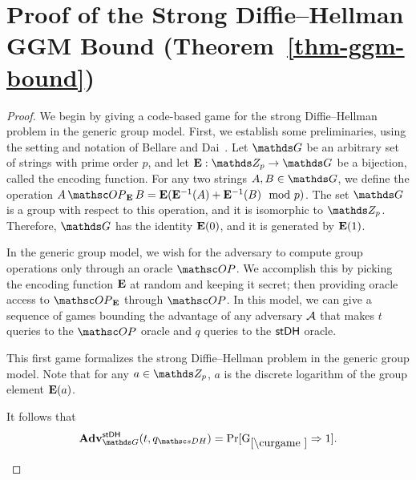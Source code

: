 \section{Proof of the Strong Diffie--Hellman GGM Bound (Theorem~\ref{thm-ggm-bound})}

\label{apx:strongDHproof}
\begin{proof}
We begin by giving a code-based game for the strong Diffie--Hellman problem in the generic group model. First, we establish some preliminaries, using the setting and notation of Bellare and Dai~\cite{INDOCRYPT:BelDai20}.  Let $\group$ be an arbitrary set of strings with prime order $p$, and let $\E: \ZZ_p \to \group$ be a bijection, called the encoding function. For any two strings $A, B \in \group$, we define the operation $A \mathop{\OP_\E} B = \E(\E^{-1}(A) + \E^{-1}(B) \mod p)$. The set $\group$ is a group with respect to this operation, and it is isomorphic to $\ZZ_p$. Therefore, $\group$ has the identity $\mathbf{E}(0)$, and it is generated by $\mathbf{E}(1)$. 

In the generic group model, we wish for the adversary to compute group operations only through an oracle $\OP$. We accomplish this by picking the encoding function $\mathbf{E}$ at random and keeping it secret; then providing oracle access to $\OP_\E$ through $\OP$. In this model, we can give a sequence of games bounding the advantage of any adversary $\mathcal{A}$ that makes $t$ queries to the $\OP$ oracle and $q$ queries to the $\mathsf{stDH}$ oracle.

This first game formalizes the strong Diffie--Hellman problem in the generic group model. Note that for any $a \in \ZZ_p$, $a$ is the discrete logarithm of the group element $\mathbf{E}(a)$. 

It follows that 
\[
	\Adv^{\strongDH}_{\group}(t, \qstDH) = \Pr[\curGm* \Rightarrow 1].
\]
\begin{figure}[tp]
	\begin{minipage}[t]{0.49\textwidth}
			

\end{minipage}
\end{figure}
\end{proof}
